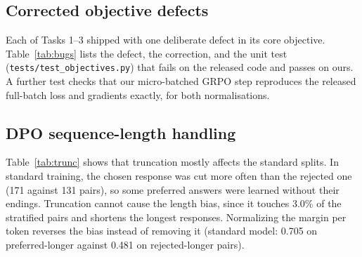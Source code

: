 \documentclass{article}
\begin{document}
\subsection{Corrected objective defects}
Each of Tasks 1--3 shipped with one deliberate defect in its core objective. Table~\ref{tab:bugs} lists the defect, the correction, and the unit test (\texttt{tests/test\_objectives.py}) that fails on the released code and passes on ours. A further test checks that our micro-batched GRPO step reproduces the released full-batch loss and gradients exactly, for both normalisations.

\begin{table}[h!]
\centering\small
\caption{Objective defects in the released code and their validation.}
\label{tab:bugs}
\end{table}


\subsection{DPO sequence-length handling}
\label{app:trunc}
Table~\ref{tab:trunc} shows that truncation mostly affects the standard splits. In standard training, the chosen response was cut more often than the rejected one (171 against 131 pairs), so some preferred answers were learned without their endings. Truncation cannot cause the length bias, since it touches 3.0\% of the stratified pairs and shortens the longest responses. Normalizing the margin per token reverses the bias instead of removing it (standard model: 0.705 on preferred-longer against 0.481 on rejected-longer pairs).
\end{document}
